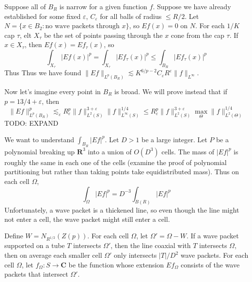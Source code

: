 Suppose all of $B_R$ is narrow for a given function $f$. Suppose we have already established for some fixed $\varepsilon$, $C_\varepsilon$ for all balls of radius $\leq R/2$. Let $N = \{ x \in B_2: \text{no wave packets through $x$} \}$, so $Ef(x) = 0$ on $N$. For each $1/K$ cap $\tau$, elt $X_\tau$ be the set of points passing through the $x$ cone from the cap $\tau$. If $x \in X_\tau$, then $Ef(x) = Ef_\tau(x)$, so
%
\[ \int_{X_\tau} |Ef(x)|^p = \int_{X_\tau} |Ef_\tau(x)|^p \leq \int_{B_R} |Ef_\tau(x)|^p \]
%
Thus
%
%
Thus we have found $\| E f\|_{L^p(B_R)} \lesssim K^{6/p - 2} C_\varepsilon R^\varepsilon \| f \|_{L^\infty}$.

Now let's imagine every point in $B_R$ is broad. We will prove instead that if $p = 13/4 + \varepsilon$, then
%
\[ \| Ef \|_{L^p(B_R)}^p \lesssim_\varepsilon R_\varepsilon^p \| f \|_{L^2(S)}^{3 + \varepsilon} \| f \|_{L^\infty(S)}^{1/4} \leq R_\varepsilon^p \| f \|_{L^2(S)}^{3 + \varepsilon} \max_\Theta \| f \|_{L^2(\Theta)}^{1/4} \]
%
TODO: EXPAND

We want to understand $\int_{B_R} |Ef|^p$. Let $D > 1$ be a large integer. Let $P$ be a polynomial breaking up $\mathbf{R}^3$ into a union of $O(D^3)$ cells. The mass of $|Ef|^p$ is roughly the same in each one of the cells (examine the proof of polynomial partitioning but rather than taking points take equidistributed mass). Thus on each cell $\Omega$,
%
\[ \int_\Omega |Ef|^p = D^{-3} \int_{B(R)} |Ef|^p \]
%
Unfortunately, a wave packet is a thickened line, so even though the line might not enter a cell, the wave packet might still enter a cell.

Define $W = N_{R^{1/2}}(Z(p))$. For each cell $\Omega$, let $\Omega' = \Omega - W$. If a wave packet supported on a tube $T$ intersects $\Omega'$, then the line coaxial with $T$ intersects $\Omega$, then on average each smaller cell $\Omega'$ only intersects $|T|/D^2$ wave packets. For each cell $\Omega$, let $f_\Omega: S \to \mathbf{C}$ be the function whose extension $Ef_\Omega$ consists of the wave packets that intersect $\Omega'$.

\begin{thebibliography}{9}

\end{thebibliography}

